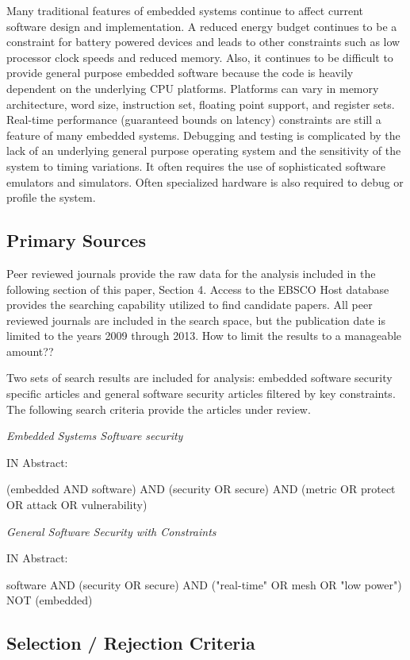 \documentclass[final,conference,10pt]{IEEEtran}
\begin{document}
Many traditional features of embedded systems continue to affect current software design and implementation.  A reduced energy budget continues to be a constraint for battery powered devices and leads to other constraints such as low processor clock speeds and reduced memory.  Also, it continues to be difficult to provide general purpose embedded software because the code is heavily dependent on the underlying CPU platforms.  Platforms can vary in memory architecture, word size, instruction set,  floating point support, and register sets.  Real-time performance (guaranteed bounds on latency) constraints are still a feature of many embedded systems. Debugging and testing is complicated by the lack of an underlying general purpose operating system and the sensitivity of the system to timing variations.  It often requires the use of sophisticated software emulators and simulators.   Often specialized hardware is also required to debug or profile the system.

\subsection{Primary Sources}

Peer reviewed journals provide the raw data for the analysis included in the following section of this paper, Section 4.  Access to the EBSCO Host database provides the searching capability utilized to find candidate papers.  All peer reviewed journals are included in the search space, but the publication date is limited to the years 2009 through 2013.  How to limit the results to a manageable amount??

Two sets of search results are included for analysis: embedded software security specific articles and general software security articles filtered by key constraints.  The following search criteria provide the articles under review. 

\textit{Embedded Systems Software security}

IN Abstract:

(embedded AND software) AND (security OR secure) AND (metric OR protect OR attack OR vulnerability)

\textit{General Software Security with Constraints}

	IN Abstract:

	software AND (security OR secure) AND ("real-time" OR mesh OR "low power") NOT (embedded)

\subsection{Selection / Rejection Criteria}
\end{document}
